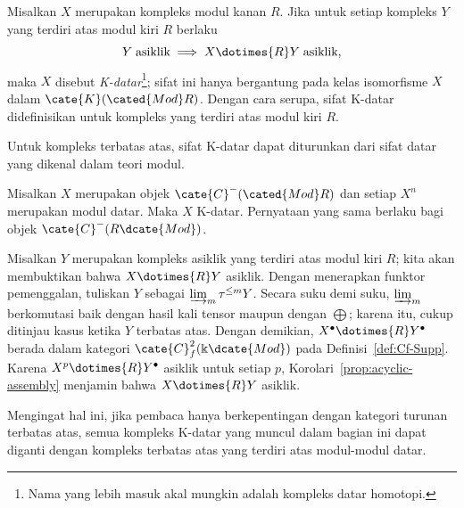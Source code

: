 \begin{definisi}
	Misalkan $X$ merupakan kompleks modul kanan $R$. Jika untuk setiap kompleks
	$Y$ yang terdiri atas modul kiri $R$ berlaku
	\[ Y \;\text{asiklik} \implies X \dotimes{R} Y\;\text{asiklik}, \]
	maka $X$ disebut \emph{K-datar}\footnote{Nama yang lebih masuk akal mungkin
	adalah kompleks datar homotopi.}; sifat ini hanya bergantung pada kelas
	isomorfisme $X$ dalam $\cate{K}(\cated{Mod}R)$. Dengan cara serupa, sifat
	K-datar didefinisikan untuk kompleks yang terdiri atas modul kiri $R$.
\end{definisi}

Untuk kompleks terbatas atas, sifat K-datar dapat diturunkan dari sifat datar
yang dikenal dalam teori modul.

\begin{proposisi}\label{prop:flat-K-flat}
	Misalkan $X$ merupakan objek $\cate{C}^-(\cated{Mod}R)$ dan setiap $X^n$
	merupakan modul datar. Maka $X$ K-datar. Pernyataan yang sama berlaku bagi
	objek $\cate{C}^-(R\dcate{Mod})$.
\end{proposisi}

\begin{bukti}
	Misalkan $Y$ merupakan kompleks asiklik yang terdiri atas modul kiri $R$;
	kita akan membuktikan bahwa $X\dotimes{R}Y$ asiklik. Dengan menerapkan funktor
	pemenggalan, tuliskan $Y$ sebagai $\varinjlim_m\tau^{\leq m}Y$. Secara suku
	demi suku, $\varinjlim_m$ berkomutasi baik dengan hasil kali tensor
	\cite[Proposisi 6.9.2]{Li1} maupun dengan $\bigoplus$; karena itu, cukup
	ditinjau kasus ketika $Y$ terbatas atas. Dengan demikian,
	$X^\bullet\dotimes{R}Y^\bullet$ berada dalam kategori
	$\cate{C}^2_f(\Bbbk\dcate{Mod})$ pada Definisi~\ref{def:Cf-Supp}. Karena
	$X^p\dotimes{R}Y^\bullet$ asiklik untuk setiap $p$,
	Korolari~\ref{prop:acyclic-assembly} menjamin bahwa $X\dotimes{R}Y$ asiklik.
\end{bukti}

Mengingat hal ini, jika pembaca hanya berkepentingan dengan kategori turunan
terbatas atas, semua kompleks K-datar yang muncul dalam bagian ini dapat
diganti dengan kompleks terbatas atas yang terdiri atas modul-modul datar.

